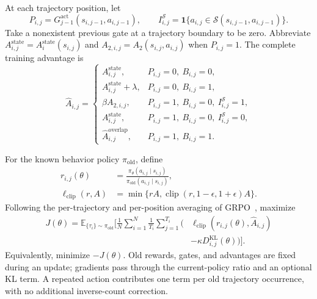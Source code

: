 \documentclass[10pt]{article}
\begin{document}
At each trajectory position, let
\begin{equation}
P_{i,j}
=G_{j-1}^{\mathrm{act}}(s_{i,j-1},a_{i,j-1}),\qquad
I^{\mathcal S}_{i,j}
=\mathbf{1}\{a_{i,j}\in
 \mathcal S(s_{i,j-1},a_{i,j-1})\}.
\end{equation}
Take a nonexistent previous gate at a trajectory boundary to be zero.
Abbreviate \(A^{\mathrm{state}}_{i,j}
=A_i^{\mathrm{state}}(s_{i,j})\) and
\(A_{2,i,j}=A_2(s_{i,j},a_{i,j})\) when \(P_{i,j}=1\).
The complete training advantage is
\begin{equation}
\widehat A_{i,j}=
\begin{cases}
A^{\mathrm{state}}_{i,j},
 &P_{i,j}=0,\ B_{i,j}=0,\\
A^{\mathrm{state}}_{i,j}+\lambda,
 &P_{i,j}=0,\ B_{i,j}=1,\\
\beta A_{2,i,j},
 &P_{i,j}=1,\ B_{i,j}=0,\ I^{\mathcal S}_{i,j}=1,\\
A^{\mathrm{state}}_{i,j},
 &P_{i,j}=1,\ B_{i,j}=0,\ I^{\mathcal S}_{i,j}=0,\\
\widehat A_{i,j}^{\mathrm{overlap}},
 &P_{i,j}=1,\ B_{i,j}=1.
\end{cases}
\end{equation}

For the known behavior policy \(\pi_{\mathrm{old}}\), define
\begin{align}
r_{i,j}(\theta)
&=\frac{\pi_\theta(a_{i,j}\mid s_{i,j})}
        {\pi_{\mathrm{old}}(a_{i,j}\mid s_{i,j})},\\
\ell_{\mathrm{clip}}(r,A)
&=\min\{rA,\operatorname{clip}(r,1-\epsilon,1+\epsilon)A\}.
\end{align}
Following the per-trajectory and per-position averaging of
GRPO~\cite{shao2024deepseekmath}, maximize
\begin{equation}
\begin{aligned}
J(\theta)
=\mathbb E_{\{\tau_i\}\sim\pi_{\mathrm{old}}}\Bigg[
 \frac{1}{N}\sum_{i=1}^{N}\frac{1}{T_i}
 \sum_{j=1}^{T_i}\Big(
 &\ell_{\mathrm{clip}}
   (r_{i,j}(\theta),\widehat A_{i,j})\\[-2pt]
 &-\kappa D^{\mathrm{KL}}_{i,j}(\theta)
 \Big)\Bigg].
\end{aligned}
\end{equation}
Equivalently, minimize \(-J(\theta)\). Old rewards, gates, and
advantages are fixed during an update; gradients pass through the
current-policy ratio and an optional KL term. A repeated action
contributes one term per old trajectory occurrence, with no
additional inverse-count correction.
\end{document}
